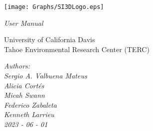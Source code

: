\begin{titlepage}
    \begin{center}
        \centerline{
        \texttt{[image: Graphs/SI3DLogo.eps]}}

        \vspace{0.5cm}
        \huge{
        {\selectfont
        \textit{User Manual}
        }
        }
        \vspace{1cm}

        {\selectfont
        \Large{
        University of California Davis\\
        Tahoe Environmental Research Center (TERC)
        }
        }
        
        \vspace{0.5cm}
        {\selectfont
        \Large{
        \textit{Authors:}\\
        \textit{Sergio A. Valbuena Mateus}\\
        \textit{Alicia Cort\'{e}s}\\
        \textit{Micah Swann}\\
        \textit{Federico Zabaleta}\\
        \textit{Kenneth Larrieu}\\
        }
        \vspace{0.5cm}
        {\selectfont
        \textit{2023 - 06 - 01}\\
        }
        }

    \end{center}
\end{titlepage}